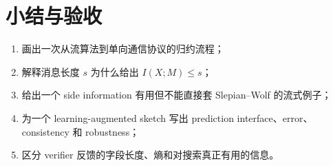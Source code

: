 \section{小结与验收}

\begin{checkpointbox}
\begin{enumerate}
  \item 画出一次从流算法到单向通信协议的归约流程；
  \item 解释消息长度 $s$ 为什么给出 $I(X;M)\le s$；
  \item 给出一个 side information 有用但不能直接套 Slepian--Wolf 的流式例子；
  \item 为一个 learning-augmented sketch 写出 prediction interface、error、consistency 和 robustness；
  \item 区分 verifier 反馈的字段长度、熵和对搜索真正有用的信息。
\end{enumerate}
\end{checkpointbox}
